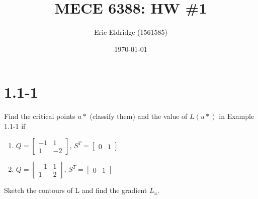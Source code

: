 \documentclass{article}
\title{MECE 6388: HW \#1}
\date{\today}
\author{Eric Eldridge (1561585)}
\begin{document}
 \maketitle

  \section{1.1-1}

  Find the critical points $u*$ (classify them) and the value of $L(u*)$ in
Example 1.1-1 if
  \begin{enumerate}[label=(\alph*)]
    \item $Q = \begin{bmatrix}
      -1 & 1 \\
      1 & -2
    \end{bmatrix}$, $S^T = \begin{bmatrix}
      0 & 1
      \end{bmatrix}$
    \item $Q = \begin{bmatrix}
      -1 & 1 \\
      1 & 2
    \end{bmatrix}$, $S^T = \begin{bmatrix}
      0 & 1
    \end{bmatrix}$
  \end{enumerate}

  \noindent Sketch the contours of L and find the gradient $L_u$.
  \newline \newline
\end{document}
